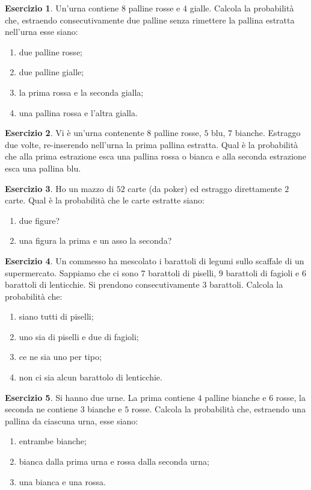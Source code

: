 \documentclass[12pt,a4paper]{article}
\theoremstyle{definition}
\newtheorem{exe}{Esercizio}
\begin{document}
\begin{exe}
	Un'urna contiene $ 8 $  palline rosse e $ 4 $ gialle. Calcola la probabilità che, estraendo consecutivamente due palline senza rimettere la pallina estratta nell'urna esse siano:
	\begin{enumerate}
		\item due palline rosse;
		\item due palline gialle;
		\item la prima rossa e la seconda gialla;
		\item una pallina rossa e l'altra gialla.
	\end{enumerate}
\end{exe}

\begin{exe}
	Vi è un'urna contenente $ 8 $ palline rosse, $ 5 $ blu, $ 7 $ bianche. Estraggo due volte,
	re-inserendo nell'urna la prima pallina estratta. Qual è la probabilità che alla
	prima estrazione esca una pallina rossa o bianca e alla seconda estrazione esca
	una pallina blu.
\end{exe}

\begin{exe}
	Ho un mazzo di $ 52 $ carte (da poker) ed estraggo direttamente $ 2 $ carte. Qual
	è la probabilità che le carte estratte siano:
	\begin{enumerate}
		\item due figure?
		\item una figura la prima e un asso la seconda?
	\end{enumerate}
\end{exe}

\begin{exe}
	Un commesso ha mescolato i barattoli di legumi sullo scaffale di un supermercato. Sappiamo che ci sono $ 7 $ barattoli di piselli, $ 9 $ barattoli di fagioli e $ 6 $ barattoli di lenticchie. Si prendono consecutivamente $ 3 $ barattoli. Calcola la probabilità che:
	\begin{enumerate}
		\item siano tutti di piselli;
		\item uno sia di piselli e due di fagioli;
		\item ce ne sia uno per tipo;
		\item non ci sia alcun barattolo di lenticchie.
	\end{enumerate}
\end{exe}

\begin{exe}
	Si hanno due urne. La prima contiene $ 4 $ palline bianche e $ 6 $ rosse, la seconda ne contiene $ 3 $ bianche e $ 5 $ rosse. Calcola la probabilità che, estraendo una pallina da ciascuna urna, esse siano:
	\begin{enumerate}
		\item entrambe bianche;
		\item bianca dalla prima urna e rossa dalla seconda urna;
		\item una bianca e una rossa.
	\end{enumerate}
\end{exe}
\end{document}
